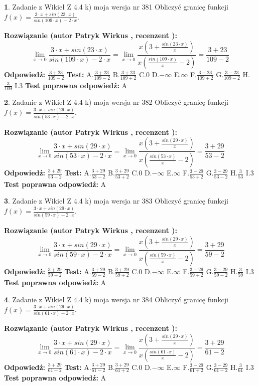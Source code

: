 \documentclass[12pt, a4paper]{article}
\theoremstyle{definition} %
\newtheorem{zad}{}
\newcommand{\zadStart}[1]{\begin{zad}#1\newline}
\newcommand{\zadStop}{\end{zad}}
\newcommand{\rozwStart}[2]{\noindent \textbf{Rozwiązanie (autor #1 , recenzent #2): }\newline}
\newcommand{\rozwStop}{\newline}
\newcommand{\odpStart}{\noindent \textbf{Odpowiedź:}\newline}
\newcommand{\odpStop}{\newline}
\newcommand{\testStart}{\noindent \textbf{Test:}\newline}
\newcommand{\testStop}{\newline}
\newcommand{\kluczStart}{\noindent \textbf{Test poprawna odpowiedź:}\newline}
\newcommand{\kluczStop}{\newline}
\begin{document}
\zadStart{Zadanie z Wikieł Z 4.4 k) moja wersja nr 381}
Obliczyć granicę funkcji $f(x)=\frac{3\cdot x +sin(23\cdot x)}{sin(109\cdot x) -2\cdot x}$.
\zadStop
\rozwStart{Patryk Wirkus}{}
$$\lim\limits_{x\to 0}\frac{3\cdot x +sin(23\cdot x)}{sin(109\cdot x) -2\cdot x}
=\lim\limits_{x\to 0}\frac{x(3+\frac{sin(23\cdot x)}{x})}{x(\frac{sin(109\cdot x)}{x}-2)}
=\frac{3+23}{109-2}$$
\rozwStop
\odpStart
$\frac{3+23}{109-2}$
\odpStop
\testStart
A.$\frac{3+23}{109-2}$
B.$\frac{3+23}{109+2}$
C.$0$
D.$-\infty$
E.$\infty$
F.$\frac{3-23}{109+2}$
G.$\frac{3-23}{109-2}$
H.$\frac{3}{109}$
I.$3$
\testStop
\kluczStart
A
\kluczStop



\zadStart{Zadanie z Wikieł Z 4.4 k) moja wersja nr 382}
Obliczyć granicę funkcji $f(x)=\frac{3\cdot x +sin(29\cdot x)}{sin(53\cdot x) -2\cdot x}$.
\zadStop
\rozwStart{Patryk Wirkus}{}
$$\lim\limits_{x\to 0}\frac{3\cdot x +sin(29\cdot x)}{sin(53\cdot x) -2\cdot x}
=\lim\limits_{x\to 0}\frac{x(3+\frac{sin(29\cdot x)}{x})}{x(\frac{sin(53\cdot x)}{x}-2)}
=\frac{3+29}{53-2}$$
\rozwStop
\odpStart
$\frac{3+29}{53-2}$
\odpStop
\testStart
A.$\frac{3+29}{53-2}$
B.$\frac{3+29}{53+2}$
C.$0$
D.$-\infty$
E.$\infty$
F.$\frac{3-29}{53+2}$
G.$\frac{3-29}{53-2}$
H.$\frac{3}{53}$
I.$3$
\testStop
\kluczStart
A
\kluczStop



\zadStart{Zadanie z Wikieł Z 4.4 k) moja wersja nr 383}
Obliczyć granicę funkcji $f(x)=\frac{3\cdot x +sin(29\cdot x)}{sin(59\cdot x) -2\cdot x}$.
\zadStop
\rozwStart{Patryk Wirkus}{}
$$\lim\limits_{x\to 0}\frac{3\cdot x +sin(29\cdot x)}{sin(59\cdot x) -2\cdot x}
=\lim\limits_{x\to 0}\frac{x(3+\frac{sin(29\cdot x)}{x})}{x(\frac{sin(59\cdot x)}{x}-2)}
=\frac{3+29}{59-2}$$
\rozwStop
\odpStart
$\frac{3+29}{59-2}$
\odpStop
\testStart
A.$\frac{3+29}{59-2}$
B.$\frac{3+29}{59+2}$
C.$0$
D.$-\infty$
E.$\infty$
F.$\frac{3-29}{59+2}$
G.$\frac{3-29}{59-2}$
H.$\frac{3}{59}$
I.$3$
\testStop
\kluczStart
A
\kluczStop



\zadStart{Zadanie z Wikieł Z 4.4 k) moja wersja nr 384}
Obliczyć granicę funkcji $f(x)=\frac{3\cdot x +sin(29\cdot x)}{sin(61\cdot x) -2\cdot x}$.
\zadStop
\rozwStart{Patryk Wirkus}{}
$$\lim\limits_{x\to 0}\frac{3\cdot x +sin(29\cdot x)}{sin(61\cdot x) -2\cdot x}
=\lim\limits_{x\to 0}\frac{x(3+\frac{sin(29\cdot x)}{x})}{x(\frac{sin(61\cdot x)}{x}-2)}
=\frac{3+29}{61-2}$$
\rozwStop
\odpStart
$\frac{3+29}{61-2}$
\odpStop
\testStart
A.$\frac{3+29}{61-2}$
B.$\frac{3+29}{61+2}$
C.$0$
D.$-\infty$
E.$\infty$
F.$\frac{3-29}{61+2}$
G.$\frac{3-29}{61-2}$
H.$\frac{3}{61}$
I.$3$
\testStop
\kluczStart
A
\kluczStop
\end{document}
